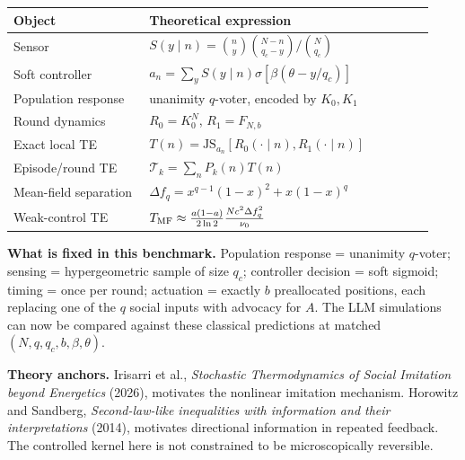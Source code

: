 \documentclass[9pt]{extarticle}
\begin{document}
\begin{center}\small
\begin{tabular}{p{0.30\linewidth}p{0.63\linewidth}}
\toprule
Object & Theoretical expression \\
\midrule
Sensor & $S(y\mid n)=\binom{n}{y}\binom{N-n}{q_c-y}/\binom{N}{q_c}$ \\
Soft controller & $a_n=\sum_yS(y\mid n)\sigma[\beta(\theta-y/q_c)]$ \\
Population response & unanimity $q$-voter, encoded by $K_0,K_1$ \\
Round dynamics & $R_0=K_0^N$, $R_1=F_{N,b}$ \\
Exact local TE & $T(n)=\mathrm{JS}_{a_n}[R_0(\cdot\mid n),R_1(\cdot\mid n)]$ \\
Episode/round TE & $\mathcal T_k=\sum_nP_k(n)T(n)$ \\
Mean-field separation & $\Delta f_q=x^{q-1}(1-x)^2+x(1-x)^q$ \\
Weak-control TE & $T_{\rm MF}\approx\frac{a(1-a)}{2\ln2}\frac{Nc^2\Delta f_q^2}{\nu_0}$ \\
\bottomrule
\end{tabular}
\end{center}

\begin{key}
\textbf{What is fixed in this benchmark.} Population response = unanimity $q$-voter; sensing = hypergeometric sample of size $q_c$; controller decision = soft sigmoid; timing = once per round; actuation = exactly $b$ preallocated positions, each replacing one of the $q$ social inputs with advocacy for $A$. The LLM simulations can now be compared against these classical predictions at matched $(N,q,q_c,b,\beta,\theta)$.
\end{key}

{\small\textbf{Theory anchors.} Irisarri et al., \emph{Stochastic Thermodynamics of Social Imitation beyond Energetics} (2026), motivates the nonlinear imitation mechanism. Horowitz and Sandberg, \emph{Second-law-like inequalities with information and their interpretations} (2014), motivates directional information in repeated feedback. The controlled kernel here is not constrained to be microscopically reversible.}
\end{document}
